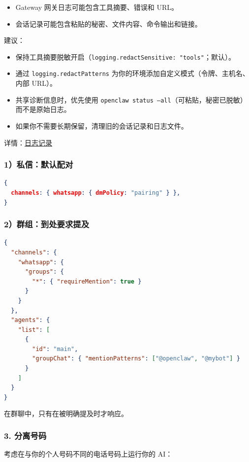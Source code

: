 \begin{itemize}
  \item Gateway 网关日志可能包含工具摘要、错误和 URL。
  \item 会话记录可能包含粘贴的秘密、文件内容、命令输出和链接。
\end{itemize}


建议：

\begin{itemize}
  \item 保持工具摘要脱敏开启（\texttt{logging.redactSensitive: "tools"}；默认）。
  \item 通过 \texttt{logging.redactPatterns} 为你的环境添加自定义模式（令牌、主机名、内部 URL）。
  \item 共享诊断信息时，优先使用 \texttt{openclaw status --all}（可粘贴，秘密已脱敏）而不是原始日志。
  \item 如果你不需要长期保留，清理旧的会话记录和日志文件。
\end{itemize}


详情：\href{/gateway/logging}{日志记录}

\subsubsection{1）私信：默认配对}


\begin{lstlisting}[language=json]
{
  channels: { whatsapp: { dmPolicy: "pairing" } },
}
\end{lstlisting}


\subsubsection{2）群组：到处要求提及}


\begin{lstlisting}[language=json]
{
  "channels": {
    "whatsapp": {
      "groups": {
        "*": { "requireMention": true }
      }
    }
  },
  "agents": {
    "list": [
      {
        "id": "main",
        "groupChat": { "mentionPatterns": ["@openclaw", "@mybot"] }
      }
    ]
  }
}
\end{lstlisting}


在群聊中，只有在被明确提及时才响应。

\subsubsection{3. 分离号码}


考虑在与你的个人号码不同的电话号码上运行你的 AI：

